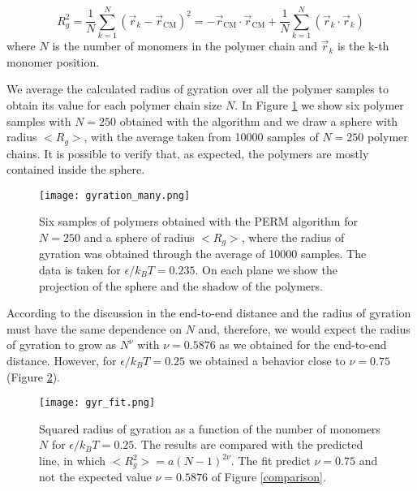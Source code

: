 \documentclass[aps,prl,reprint,groupedaddress]{revtex4-1}
\begin{document}
\begin{equation}
	R_g^2 = \frac{1}{N}\sum_{k=1}^N \left(\vec{r}_k - \vec{r}_{\text{CM}}\right)^2 = - \vec{r}_{\text{CM}} \cdot \vec{r}_{\text{CM}} + \frac{1}{N}\sum_{k=1}^N \left(\vec{r}_k \cdot \vec{r}_k \right)
\end{equation}
where $N$ is the number of monomers in the polymer chain and $\vec{r}_k$ is the k-th monomer position.

We average the calculated radius of gyration over all the polymer samples to obtain its value for each polymer chain size $N$. In Figure \ref{gyration_idea} we show six polymer samples with $N=250$ obtained with the algorithm and we draw a sphere with radius $<R_g>$, with the average taken from 10000 samples of $N=250$ polymer chains. It is possible to verify that, as expected, the polymers are mostly contained inside the sphere.  

\begin{figure}[ht]
	\texttt{[image: gyration\_many.png]}
	\caption{Six samples of polymers obtained with the PERM algorithm for $N=250$ and a sphere of radius $<R_g>$, where the radius of gyration was obtained through the average of 10000 samples. The data is taken for $\epsilon/k_B T = 0.235$. On each plane we show the projection of the sphere and the shadow of the polymers. \label{gyration_idea}}
\end{figure}

According to the discussion in \cite{Smith1975} the end-to-end distance and the radius of gyration must have the same dependence on $N$ and, therefore, we would expect the radius of gyration to grow as $N^{\nu}$ with $\nu = 0.5876$ as we obtained for the end-to-end distance. However, for $\epsilon/k_B T = 0.25$ we obtained a behavior close to $\nu = 0.75$ (Figure \ref{gyr_fit}).

\begin{figure}[ht]
	\texttt{[image: gyr\_fit.png]}
	\caption{Squared radius of gyration as a function of the number of monomers $N$ for $\epsilon/k_B T = 0.25$. The results are compared with the predicted line, in which $<R_g^2> = a(N-1)^{2 \nu}$. The fit predict $\nu = 0.75$ and not the expected value $\nu = 0.5876$ of Figure \ref{comparison}. \label{gyr_fit}}
\end{figure}
\end{document}
